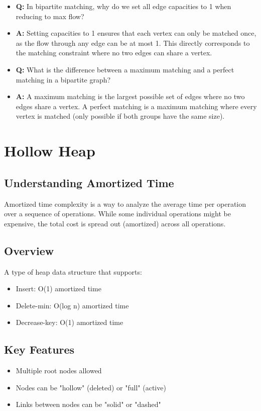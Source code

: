\documentclass[11pt,a4paper]{article}
\begin{document}
\begin{multicols}{2}
\begin{itemize}
    \item \textbf{Q:} In bipartite matching, why do we set all edge capacities to 1 when reducing to max flow?
    \item \textbf{A:} Setting capacities to 1 ensures that each vertex can only be matched once, as the flow through any edge can be at most 1. This directly corresponds to the matching constraint where no two edges can share a vertex.

    \item \textbf{Q:} What is the difference between a maximum matching and a perfect matching in a bipartite graph?
    \item \textbf{A:} A maximum matching is the largest possible set of edges where no two edges share a vertex. A perfect matching is a maximum matching where every vertex is matched (only possible if both groups have the same size).
\end{itemize}

\section{Hollow Heap}
\subsection{Understanding Amortized Time}
Amortized time complexity is a way to analyze the average time per operation over a sequence of operations. While some individual operations might be expensive, the total cost is spread out (amortized) across all operations.

\subsection{Overview}
A type of heap data structure that supports:
\begin{itemize}
    \item Insert: O(1) amortized time
    \item Delete-min: O(log n) amortized time
    \item Decrease-key: O(1) amortized time
\end{itemize}

\subsection{Key Features}
\begin{itemize}
    \item Multiple root nodes allowed
    \item Nodes can be "hollow" (deleted) or "full" (active)
    \item Links between nodes can be "solid" or "dashed"
\end{itemize}


\end{multicols}
\end{document}
